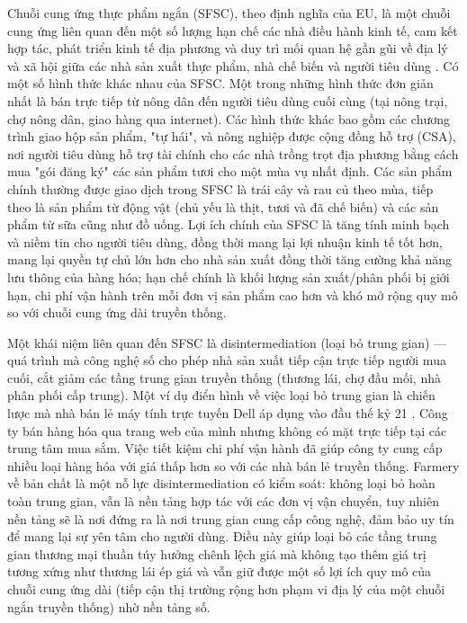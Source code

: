 Chuỗi cung ứng thực phẩm ngắn (SFSC), theo định nghĩa của EU, là một chuỗi cung ứng liên quan đến một số lượng hạn chế các nhà điều hành kinh tế, cam kết hợp tác, phát triển kinh tế địa phương và duy trì mối quan hệ gần gũi về địa lý và xã hội giữa các nhà sản xuất thực phẩm, nhà chế biến và người tiêu dùng \cite{tapchicongsan2018}. Có một số hình thức khác nhau của SFSC. Một trong những hình thức đơn giản nhất là bán trực tiếp từ nông dân đến người tiêu dùng cuối cùng (tại nông trại, chợ nông dân, giao hàng qua internet). Các hình thức khác bao gồm các chương trình giao hộp sản phẩm, "tự hái", và nông nghiệp được cộng đồng hỗ trợ (CSA), nơi người tiêu dùng hỗ trợ tài chính cho các nhà trồng trọt địa phương bằng cách mua "gói đăng ký" các sản phẩm tươi cho một mùa vụ nhất định. Các sản phẩm chính thường được giao dịch trong SFSC là trái cây và rau củ theo mùa, tiếp theo là sản phẩm từ động vật (chủ yếu là thịt, tươi và đã chế biến) và các sản phẩm từ sữa cũng như đồ uống. Lợi ích chính của SFSC là tăng tính minh bạch và niềm tin cho người tiêu dùng, đồng thời mang lại lợi nhuận kinh tế tốt hơn, mang lại quyền tự chủ lớn hơn cho nhà sản xuất đồng thời tăng cường khả năng lưu thông của hàng hóa; hạn chế chính là khối lượng sản xuất/phân phối bị giới hạn, chi phí vận hành trên mỗi đơn vị sản phẩm cao hơn và khó mở rộng quy mô so với chuỗi cung ứng dài truyền thống.


Một khái niệm liên quan đến SFSC là disintermediation (loại bỏ trung gian) — quá trình mà công nghệ số cho phép nhà sản xuất tiếp cận trực tiếp người mua cuối, cắt giảm các tầng trung gian truyền thống (thương lái, chợ đầu mối, nhà phân phối cấp trung). Một ví dụ điển hình về việc loại bỏ trung gian là chiến lược mà nhà bán lẻ máy tính trực tuyến Dell áp dụng vào đầu thế kỷ 21 \cite{britannica_disintermediation}. Công ty bán hàng hóa qua trang web của mình nhưng không có mặt trực tiếp tại các trung tâm mua sắm. Việc tiết kiệm chi phí vận hành đã giúp công ty cung cấp nhiều loại hàng hóa với giá thấp hơn so với các nhà bán lẻ truyền thống. Farmery về bản chất là một nỗ lực disintermediation có kiểm soát: không loại bỏ hoàn toàn trung gian, vẫn là nền tảng hợp tác với các đơn vị vận chuyển, tuy nhiên nền tảng sẽ là nơi đứng ra là nơi trung gian cung cấp công nghệ, đảm bảo uy tín để mang lại sự yên tâm cho người dùng. Điều này giúp loại bỏ các tầng trung gian thương mại thuần túy hưởng chênh lệch giá mà không tạo thêm giá trị tương xứng như thương lái ép giá và vẫn giữ được một số lợi ích quy mô của chuỗi cung ứng dài (tiếp cận thị trường rộng hơn phạm vi địa lý của một chuỗi ngắn truyền thống) nhờ nền tảng số.

